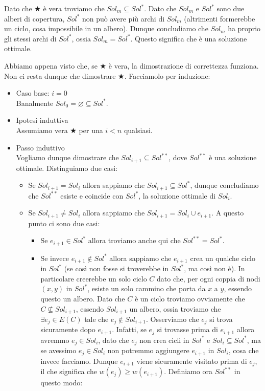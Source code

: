\documentclass[11pt, a4paper, titlepage, oneside]{scrbook}
\begin{document}
Dato che $\bigstar$ è vera troviamo che $Sol_m \subseteq Sol^*$. Dato che $Sol_m$ e $Sol^*$ sono due alberi di copertura, $Sol^*$ non può avere più archi di $Sol_m$ (altrimenti formerebbe un ciclo, cosa impossibile in un albero). Dunque concludiamo che $Sol_m$ ha proprio gli stessi archi di $Sol^*$, ossia $Sol_m = Sol^*$. Questo significa che  è una soluzione ottimale.

Abbiamo appena visto che, se $\bigstar$ è vera, la dimostrazione di correttezza funziona. Non ci resta dunque che dimostrare $\bigstar$. Facciamolo per induzione:

\begin{itemize}
    \item Caso base: $i = 0$ \\
    Banalmente $Sol_0 = \varnothing \subseteq Sol^*$. 
    \item Ipotesi induttiva \\
    Assumiamo vera $\bigstar$ per una $i < n$ qualsiasi.
    \item Passo induttivo \\
    Vogliamo dunque dimostrare che $Sol_{i+1} \subseteq Sol^{**}$, dove $Sol^{**}$ è una soluzione ottimale. Distinguiamo due casi:
    \begin{itemize}
        \item Se $Sol_{i+1} = Sol_i$ allora sappiamo che $Sol_{i+1} \subseteq Sol^*$, dunque concludiamo che $Sol^{**}$ esiste e coincide con $Sol^*$, la soluzione ottimale di $Sol_i$. 
        \item Se $Sol_{i+1} \neq Sol_i$ allora sappiamo che $Sol_{i+1} = Sol_i \cup e_{i+1}$. A questo punto ci sono due casi:
        \begin{itemize}
            \item Se $e_{i+1} \in Sol^*$ allora troviamo anche qui che $Sol^{**} = Sol^*$.
            \item Se invece $e_{i+1} \notin Sol^*$ allora sappiamo che $e_{i+1}$ crea un qualche ciclo in $Sol^*$ (se così non fosse si troverebbe in $Sol^*$, ma così non è). In particolare creerebbe un solo ciclo $C$ dato che, per ogni coppia di nodi $(x,y)$ in $Sol^*$, esiste un solo cammino che porta da $x$ a $y$, essendo questo un albero. Dato che $C$ è un ciclo troviamo ovviamente che $C \nsubseteq Sol_{i+1}$, essendo $Sol_{i+1}$ un albero, ossia troviamo che $\exists e_j \in E(C)$ tale che $e_j \notin Sol_{i+1}$. Osserviamo che $e_j$ si trova sicuramente dopo $e_{i+1}$. Infatti, se $e_j$ si trovasse prima di $e_{i+1}$ allora avremmo $e_j \in Sol_i$, dato che $e_j$ non crea cicli in $Sol^*$ e $Sol_i \subseteq Sol^*$, ma se avessimo $e_j \in Sol_i$ non potremmo aggiungere $e_{i+1}$ in $Sol_i$, cosa che invece facciamo. Dunque $e_{i+1}$ viene sicuramente visitato prima di $e_j$, il che significa che $w(e_j) \geq w(e_{i+1})$. Definiamo ora $Sol^{**}$ in questo modo:

\end{itemize}
\end{itemize}
\end{itemize}
\end{document}
